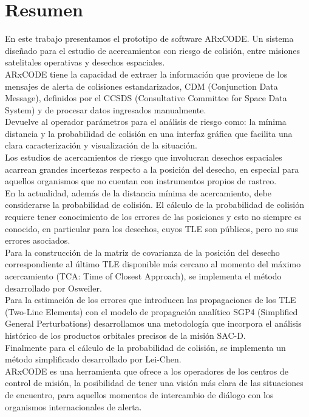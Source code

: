 \chapter*{Resumen}
\label{chap:resumen}
En este trabajo presentamos el prototipo de software ARxCODE. Un sistema dise\~nado para el estudio de acercamientos con riesgo de colisi\'on, entre misiones satelitales operativas y desechos espaciales.\\

ARxCODE tiene la capacidad de extraer la informaci\'on que proviene de los mensajes de alerta de colisiones estandarizados, CDM (Conjunction Data Message), definidos por el CCSDS (Consultative Committee for Space Data System) y de procesar datos ingresados manualmente.\\
Devuelve al operador par\'ametros para el an\'alisis de riesgo como: la m\'inima distancia y la probabilidad de colisi\'on en una interfaz gr\'afica que facilita una clara caracterizaci\'on y visualizaci\'on de la situaci\'on.\\

Los estudios de acercamientos de riesgo que involucran desechos espaciales acarrean grandes incertezas respecto a la posici\'on del desecho, en especial para aquellos organismos que no cuentan con instrumentos propios de rastreo.\\

En la actualidad, adem\'as de la distancia m\'inima de acercamiento, debe considerarse la probabilidad de colisi\'on. El c\'alculo de la probabilidad de colisi\'on requiere tener conocimiento de los errores de las posiciones y esto no siempre es conocido, en particular para los desechos, cuyos TLE son p\'ublicos, pero no sus errores asociados.\\

Para la construcci\'on de la matriz de covarianza de la posici\'on del desecho correspondiente al \'ultimo TLE disponible m\'as cercano al momento del m\'aximo acercamiento (TCA: Time of Closest Approach), se implementa el m\'etodo desarrollado por Osweiler.\\

Para la estimaci\'on de los errores que introducen las propagaciones de los TLE (Two-Line Elements) con el modelo de propagaci\'on anal\'itico SGP4 (Simplified General Perturbations) desarrollamos una metodolog\'ia que incorpora el análisis hist\'orico de los productos orbitales precisos de la misi\'on SAC-D.\\

Finalmente para el c\'alculo de la probabilidad de colisi\'on, se implementa un m\'etodo simplificado desarrollado por Lei-Chen.\\
ARxCODE es una herramienta que ofrece a los operadores de los centros de control de misi\'on, la posibilidad de tener una visi\'on m\'as clara de las situaciones de encuentro, para aquellos momentos de intercambio de di\'alogo con los organismos internacionales de alerta.

